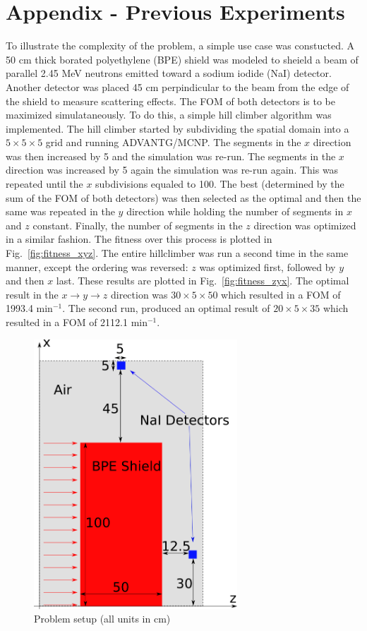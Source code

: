 \documentclass{article}
\begin{document}
\section{Appendix - Previous Experiments}\label{sec:apdx}
To illustrate the complexity of the problem, a simple use case was constucted. A 50 cm thick borated polyethylene (BPE) shield was modeled to sheield a beam of parallel 2.45 MeV neutrons emitted toward a sodium iodide (NaI) detector. Another detector was placed 45 cm perpindicular to the beam from the edge of the shield to measure scattering effects. The FOM of both detectors is to be maximized simulataneously. To do this, a simple hill climber algorithm was implemented. The hill climber started by subdividing the spatial domain into a $5 \times 5 \times 5$ grid and running ADVANTG/MCNP. The segments in the $x$ direction was then increased by 5 and the simulation was re-run. The segments in the $x$ direction was increased by 5 again the simulation was re-run again. This was repeated until the $x$ subdivisions equaled to 100. The best (determined by the sum of the FOM of both detectors) was then selected as the optimal and then the same was repeated in the $y$ direction while holding the number of segments in $x$ and $z$ constant. Finally, the number of segments in the $z$ direction was optimized in a similar fashion. The fitness over this process is plotted in Fig.~\ref{fig:fitness_xyz}. The entire hillclimber was run a second time in the same manner, except the ordering was reversed: $z$ was optimized first, followed by $y$ and then $x$ last. These results are plotted in Fig.~\ref{fig:fitness_zyx}. The optimal result in the $x \rightarrow y \rightarrow z$ direction was $30 \times 5 \times 50$ which resulted in a FOM of 1993.4 min$^{-1}$. The second run, produced an optimal result of $20 \times 5 \times 35$ which resulted in a FOM of 2112.1 min$^{-1}$.

\begin{figure}
    \centering
    \includegraphics[width=3.0in]{probsetup}
    \caption{Problem setup (all units in cm)}
    \label{fig:probsetup}
\end{figure}
\end{document}
